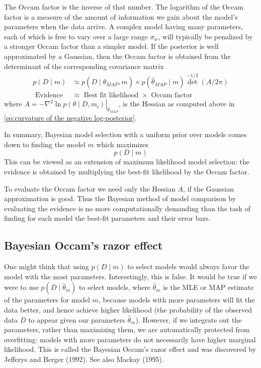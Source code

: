 \documentclass[11pt]{article}
\theoremstyle{plain} %
\theoremstyle{remark}
\begin{document}
The Occam factor is the inverse of that number. The logarithm of the Occam factor is a measure of the amount of
information we gain about the model's parameters when the data arrive. A complex model having many parameters, each of which is free to vary
over a large range $\sigma_{w}$, will typically be penalized by a stronger
Occam factor than a simpler model. If the posterior is well approximated by a Gaussian, then the Occam
factor is obtained from the determinant of the corresponding covariance matrix
$$
\begin{aligned}
  p(D \mid m) &\approx p\left(D \mid \hat{\theta}_{M A P}, m\right) \times p\left(\hat{\theta}_{M A P} \mid m\right) \operatorname{det}^{-1 / 2}(A / 2 \pi)\\
  \text{ Evidence } &\approx \text{ Best fit likelihood } \times \text{ Occam factor }
\end{aligned}
$$
where $A=-\left.\nabla^{2} \ln p\left(\theta \mid D,
  m_{i}\right)\right|_{\hat{\theta}_{M A P}}$, is the Hessian as computed above in
\cref{eq:curvature of the negative log-posterior}.

In summary, Bayesian model selection with a uniform prior over models
comes down to finding the model $m$ which maximizes
$$
  p(D \mid m)
$$
This can be viewed as an extension of maximum likelihood model
selection: the evidence is obtained by multiplying the best-fit likelihood by
the Occam factor.

To evaluate the Occam factor we need only the Hessian $A$, if the
Gaussian approximation is good. Thus the Bayesian method of model comparison by evaluating the evidence
is no more computationally demanding than the task of finding for each model
the best-fit parameters and their error bars. 

\subsection{Bayesian Occam's razor effect}

One might think that using $p(D \mid m)$
to select models would always favor the model with the most parameters. Interestingly, this is {\color{C3}false}. It would be true if we were to use $p\left(D \mid \hat{\theta}_{m}\right)$ to select models, where $\hat{\theta}_{m}$ is the MLE or MAP estimate of the
parameters for model $m$, because models with more parameters will fit the data
better, and hence achieve higher likelihood (the probability of the observed data $D$ to appear given our parameters $\hat{\theta}_{m}$). However, if we integrate out the parameters, rather than maximizing
them, we are automatically protected from overfitting: models with more
parameters do not necessarily have higher marginal likelihood. This is called the {\color{C3}Bayesian Occam's razor effect} and was discovered by
Jefferys and Berger (1992). See also Mackay (1995).
\end{document}
